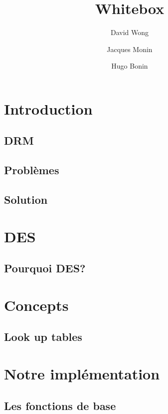 \documentclass[a4paper,12pt]{article}
\author{David Wong
  \and Jacques Monin
  \and Hugo Bonin}
\title{Whitebox}
\begin{document}
\maketitle


\section{Introduction}

\subsection{DRM}

\subsection{Problèmes}

\subsection{Solution}


\section{DES}

\subsection{Pourquoi DES?}

\section{Concepts}

\subsection{Look up tables}

\section{Notre implémentation}

\subsection{Les fonctions de base}
\end{document}
